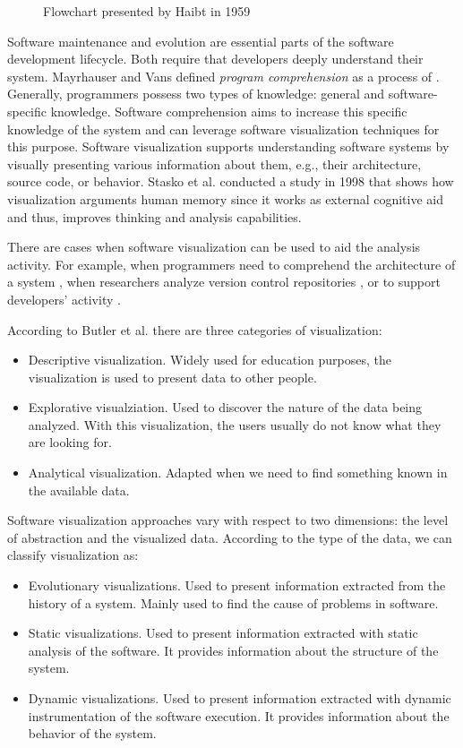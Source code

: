 \begin{figure}
  \caption{Flowchart presented by Haibt in 1959}
  \label{fig:Haibt1959_Flowchart}

\end{figure}

Software maintenance and evolution are essential parts of the software development lifecycle. Both require that developers deeply understand their system. 
Mayrhauser and Vans defined {\it program comprehension} as a process of  \cite{VonMayrhauser1995}. 
Generally, programmers possess two types of knowledge: general and software-specific knowledge. 
Software comprehension aims to increase this specific knowledge of the system and can leverage software visualization techniques for this purpose. 
Software visualization supports understanding software systems by visually presenting various information about them, e.g., their architecture, source code, or behavior.
Stasko et al.\cite{Stasko2008} conducted a study in 1998 that shows how visualization arguments human memory since 
it works as external cognitive aid and thus, improves thinking and analysis capabilities.

There are cases when software visualization can be used to aid the analysis activity. For example, when programmers need to comprehend the architecture of a system \cite{Panas2007}, when researchers analyze version control repositories \cite{Greene2017}, or to support developers' activity \cite{LopezHerrejon2018}. 

According to Butler et al. \cite{Butler1993} there are three categories of visualization:
\begin{itemize}
	 \item Descriptive visualization. Widely used for education purposes, the visualization is used to present data to other people. 
	 \item Explorative visualziation. Used to discover the nature of the data being analyzed. With this visualization, the users usually do not know what they are looking for.
	 \item Analytical visualization. Adapted when we need to find something known in the available data. 
\end{itemize}
Software visualization approaches vary with respect to two dimensions: the level of abstraction and the visualized data.
According to the type of the data, we can classify visualization as:
\begin{itemize}
	\item Evolutionary visualizations. Used to present information extracted from the history of a system. Mainly used to find the cause of problems in software. 
	\item Static visualizations. Used to present information extracted with static analysis of the software. It provides information about the structure of the system.
	\item Dynamic visualizations. Used to present information extracted with dynamic instrumentation of the software execution. It provides information about the behavior of the system.
\end{itemize}

